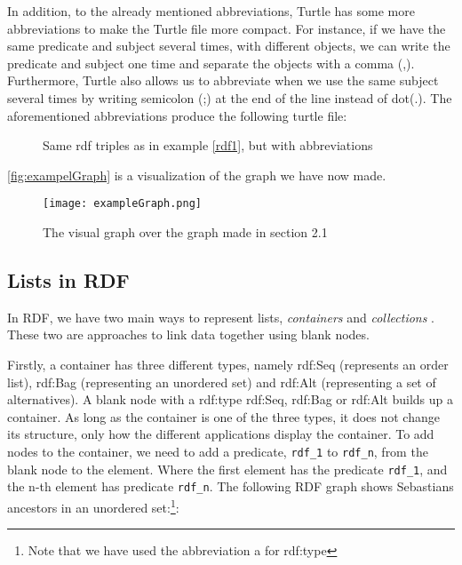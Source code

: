 \para
In addition, to the already mentioned abbreviations, Turtle has some more abbreviations to make the Turtle file more compact. For instance, if we have the same predicate and subject several times, with different objects, we can write the predicate and subject one time and separate the objects with a comma (,). Furthermore, Turtle also allows us to abbreviate when we use the same subject several times by writing semicolon (;) at the end of the line instead of dot(.). The aforementioned abbreviations produce the following turtle file:


\begin{figure}[h]
    \begin{example}
        \label{rdf2}
        Same rdf triples as in example \ref{rdf1}, but with abbreviations
    \end{example}
    
\end{figure}

\autoref{fig:exampelGraph} is a visualization of the graph we have now made.

\begin{figure}
    \centering
    \texttt{[image: exampleGraph.png]}
    \caption{The visual graph over the graph made in section 2.1}
    \label{fig:exampelGraph}
\end{figure}

\subsection{Lists in RDF}
\label{listInRDF}
In RDF, we have two main ways to represent lists, \emph{containers} and \emph{collections} \autocite[58-63]{FOSWT}. These two are approaches to link data together using blank nodes.

\para
Firstly, a container has three different types, namely rdf:Seq (represents an order list), rdf:Bag (representing an unordered set) and rdf:Alt (representing a set of alternatives). A blank node with a rdf:type rdf:Seq, rdf:Bag or rdf:Alt builds up a container. As long as the container is one of the three types, it does not change its structure, only how the different applications display the container. To add nodes to the container, we need to add a predicate, \lstinline{rdf_1} to \lstinline{rdf_n}, from the blank node to the element. Where the first element has the predicate \lstinline{rdf_1}, and the n-th element has predicate \lstinline{rdf_n}. The following RDF graph shows Sebastians ancestors in an unordered set:\footnote{Note that we have used the abbreviation a for rdf:type}:

